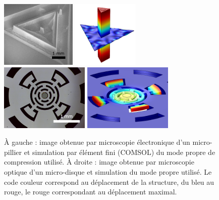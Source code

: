 \documentclass[12pt,a4paper]{article}
\begin{document}
\begin{figure}
\center
\includegraphics[height=90pt]{figures/micropillar.png}
\hfill
\includegraphics[height=90pt]{figures/micropillar_disp.png}
\hfill
\includegraphics[height=90pt]{figures/microwheel.png}
\includegraphics[height=90pt]{figures/microwheel_disp.png}
\caption{À gauche : image obtenue par microscopie électronique d'un micro-pillier et simulation par élément fini (COMSOL) du mode propre de compression utilisé.
À droite : image obtenue par microscopie optique d'un micro-disque et simulation du mode propre utilisé.
Le code couleur correspond au déplacement de la structure, du bleu au rouge, le rouge correspondant au déplacement maximal.}
\label{fig:resonators}
\end{figure}
\end{document}

